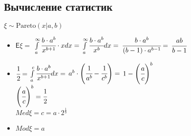 \documentclass[10pt]{extarticle}
\newcommand{\Expect}{\mathsf{E}}
\begin{document}
	\subsection{Вычисление статистик}
	$\xi \sim \mathrm{Pareto}(x | a, b)$ \\
    \begin{itemize}
        \item $\Expect{\xi} =$
	    $\int\limits_a^{\infty} \cfrac{b \cdot a^b}{x^{b + 1}} \cdot x dx =$
	    $\int\limits_a^{\infty} \cfrac{b \cdot a^b}{x^b} dx =$
	    $\cfrac{b \cdot a^b}{(b - 1) \cdot a^{b - 1}} =$
	    $\cfrac{ab}{b - 1}$
	    \item $\cfrac{1}{2} =$
	    $\int\limits_a^c \cfrac{b \cdot a^b}{x^{b + 1}} dx =$
	    $a^b \cdot \Bigg( \cfrac{1}{a^b} - \cfrac{1}{c^b} \Bigg) =$
	    $1 - \Bigg( \cfrac{a}{c} \Bigg)^b$ \\
	    $\Bigg( \cfrac{a}{c} \Bigg)^b = \cfrac{1}{2}$ \\
	    $Med \xi = c = a \cdot 2^{\frac{1}{b}}$
	    \item $Mod \xi = a$
    \end{itemize}
\end{document}
